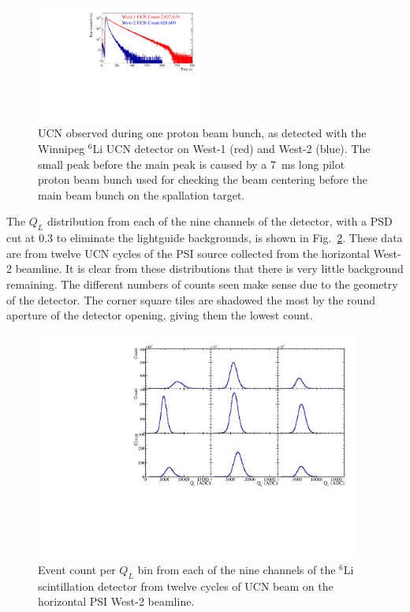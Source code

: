 \documentclass[letter,twocolumn,preprint,3p]{elsarticle}
\begin{document}
\begin{figure}[htpb] 
\begin{center} 
\includegraphics[width=0.49\textwidth]{figures/run54_to_run40_bunch0_compare.pdf} 
\caption{ UCN observed during one proton beam bunch, as detected with
  the Winnipeg $^6$Li UCN detector on West-1 (red) and West-2 (blue).
  The small peak before the main peak is caused by a 7~ms long pilot
  proton beam bunch used for checking the beam centering before the
  main beam bunch on the spallation target. }
\label{fig:protonCycle} 
\end{center} 
\end{figure}

The $Q_L$ distribution from each of the nine channels of the detector,
with a PSD cut at 0.3 to eliminate the lightguide backgrounds, is
shown in Fig.~\ref{fig:nineup}.  These data are from twelve UCN cycles
of the PSI source collected from the horizontal West-2 beamline.  It
is clear from these distributions that there is very little background
remaining.  The different numbers of counts seen make sense due to the
geometry of the detector.  The corner square tiles are shadowed the
most by the round aperture of the detector opening, giving them the
lowest count.

\begin{figure}[!htpb]
\centering
\includegraphics[width=0.95\textwidth]{figures/nineup.pdf}
\caption{ Event count per $Q_L$ bin from each of the nine channels of
  the $^{6}$Li scintillation detector from twelve cycles of UCN beam
  on the horizontal PSI West-2 beamline.}
\label{fig:nineup}
\end{figure}
\end{document}
